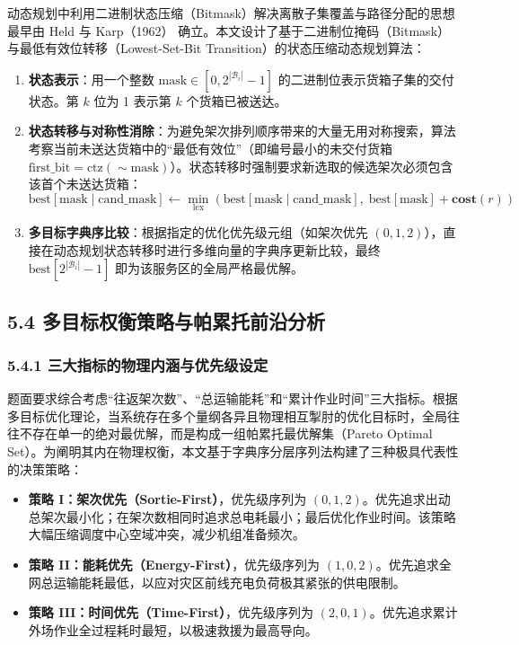 \documentclass[12pt,a4paper,UTF8]{ctexart}
\begin{document}
动态规划中利用二进制状态压缩（Bitmask）解决离散子集覆盖与路径分配的思想最早由 Held 与 Karp（1962）\cite{held1962} 确立。本文设计了基于二进制位掩码（Bitmask）与最低有效位转移（Lowest-Set-Bit Transition）的状态压缩动态规划算法：
\begin{enumerate}[leftmargin=*]
    \item \textbf{状态表示}：用一个整数 $\text{mask} \in [0, 2^{|\mathcal{B}_i|}-1]$ 的二进制位表示货箱子集的交付状态。第 $k$ 位为 1 表示第 $k$ 个货箱已被送达。
    \item \textbf{状态转移与对称性消除}：为避免架次排列顺序带来的大量无用对称搜索，算法考察当前未送达货箱中的“最低有效位”（即编号最小的未交付货箱 $\text{first\_bit} = \text{ctz}(\sim \text{mask})$）。状态转移时强制要求新选取的候选架次必须包含该首个未送达货箱：
    \begin{equation}
    \text{best}[\text{mask} \mid \text{cand\_mask}] \gets \min_{\text{lex}} \left( \text{best}[\text{mask} \mid \text{cand\_mask}], \; \text{best}[\text{mask}] + \bm{cost}(r) \right)
    \end{equation}
    \item \textbf{多目标字典序比较}：根据指定的优化优先级元组（如架次优先 $(0, 1, 2)$），直接在动态规划状态转移时进行多维向量的字典序更新比较，最终 $\text{best}[2^{|\mathcal{B}_i|}-1]$ 即为该服务区的全局严格最优解。
\end{enumerate}

\subsection{5.4 多目标权衡策略与帕累托前沿分析}

\subsubsection{5.4.1 三大指标的物理内涵与优先级设定}
题面要求综合考虑“往返架次数”、“总运输能耗”和“累计作业时间”三大指标。根据多目标优化理论\cite{ehrgott2005, marler2004}，当系统存在多个量纲各异且物理相互掣肘的优化目标时，全局往往不存在单一的绝对最优解，而是构成一组帕累托最优解集（Pareto Optimal Set）。为阐明其内在物理权衡，本文基于字典序分层序列法构建了三种极具代表性的决策策略：
\begin{itemize}[leftmargin=*]
    \item \textbf{策略 I：架次优先（Sortie-First）}，优先级序列为 $(0, 1, 2)$。优先追求出动总架次最小化；在架次数相同时追求总电耗最小；最后优化作业时间。该策略大幅压缩调度中心空域冲突，减少机组准备频次。
    \item \textbf{策略 II：能耗优先（Energy-First）}，优先级序列为 $(1, 0, 2)$。优先追求全网总运输能耗最低，以应对灾区前线充电负荷极其紧张的供电限制。
    \item \textbf{策略 III：时间优先（Time-First）}，优先级序列为 $(2, 0, 1)$。优先追求累计外场作业全过程耗时最短，以极速救援为最高导向。
\end{itemize}
\end{document}
